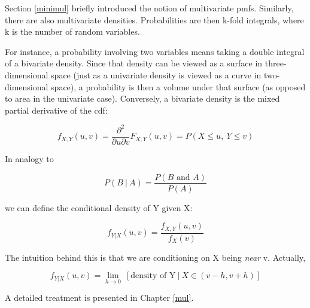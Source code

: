 Section \ref{minimul} briefly introduced the notion of multivariate
pmfs.  Similarly, there are also multivariate densities.  Probabilities
are then k-fold integrals, where k is the number of random variables. 

For instance, a probability involving two variables means taking a
double integral of a bivariate density.  Since that density can be
viewed as a surface in three-dimensional space (just as a univariate
density is viewed as a curve in two-dimensional space), a probability is
then a volume under that surface (as opposed to area in the univariate
case).  Conversely, a bivariate density is the mixed partial derivative
of the cdf:

\begin{equation}
f_{X,Y} (u,v) = \frac{\partial^2}{\partial u \partial v}
F_{X,Y}(u,v) = P(X \leq u, ~ Y \leq v)
\end{equation}

In analogy to

\begin{equation}
P(B ~|~ A) = \frac{P(B \textrm{ and } A)}{P(A)}
\end{equation}

we can define the conditional density of Y given X:

\begin{equation}
f_{Y|X} (u,v) =
\frac{f_{X,Y} (u,v)}{f_X(v)}
\end{equation}

The intuition behind this is that we are conditioning on X being {\it
near} v.  Actually, 

\begin{equation}
f_{Y|X} (u,v) =
\lim_{h \rightarrow 0} ~
\left [
\textrm{density of Y} ~|~ X \in (v-h,v+h)
\right ]
\end{equation}

A detailed treatment is presented in Chapter \ref{mul}.

% 
% 
% 

